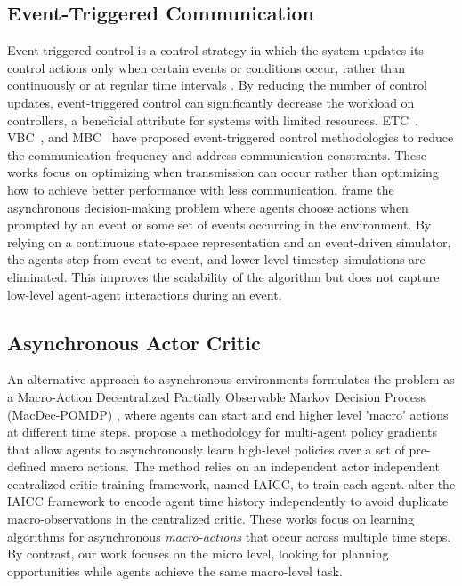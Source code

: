  \subsection{Event-Triggered Communication} 
 Event-triggered control is a control strategy in which the system updates its control actions only when certain events or conditions occur, rather than continuously or at regular time intervals \cite{ETC_descript}. By reducing the number of control updates, event-triggered control can significantly decrease the workload on controllers, a beneficial attribute for systems with limited resources. ETC~\cite{ETC}, VBC~\cite{VBC}, and MBC~\cite{MBC} have proposed event-triggered control methodologies to reduce the communication frequency and address communication constraints. These works focus on optimizing when transmission can occur rather than optimizing how to achieve better performance with less communication. \citet{Menda_2019} frame the asynchronous decision-making problem where agents choose actions when prompted by an event or some set of events occurring in the environment. By relying on a continuous state-space representation and an event-driven simulator, the agents step from event to event, and lower-level timestep simulations are eliminated. This improves the scalability of the algorithm but does not capture low-level agent-agent interactions during an event. 
\subsection{Asynchronous Actor Critic} 
An alternative approach to asynchronous environments formulates the problem as a Macro-Action Decentralized Partially Observable Markov Decision Process (MacDec-POMDP) \cite{macpomdp}, where agents can start and end higher level 'macro' actions at different time steps. \citet{IAICC} propose a methodology for multi-agent policy gradients that allow agents to asynchronously learn high-level policies over a set of pre-defined macro actions.  The method relies on an independent actor independent centralized critic training framework, named IAICC, to train each agent. \citet{AOCC}  alter the IAICC framework to encode agent time history independently to avoid duplicate macro-observations in the centralized critic. These works focus on learning algorithms for asynchronous\textit{ macro-actions} that occur across multiple time steps. By contrast, our work focuses on the micro level, looking for planning opportunities while agents achieve the same macro-level task.


